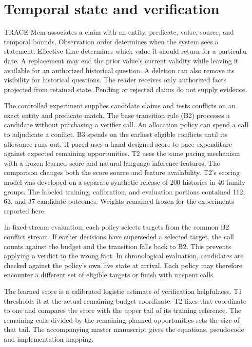 \documentclass[
  11pt,
]{article}
\begin{document}
\section{Temporal state and
verification}\label{temporal-state-and-verification}

TRACE-Mem associates a claim with an entity, predicate, value, source,
and temporal bounds. Observation order determines when the system sees a
statement. Effective time determines which value it should return for a
particular date. A replacement may end the prior value's current
validity while leaving it available for an authorized historical
question. A deletion can also remove its visibility for historical
questions. The reader receives only authorized facts projected from
retained state. Pending or rejected claims do not supply evidence.

The controlled experiment supplies candidate claims and tests conflicts
on an exact entity and predicate match. The base transition rule (B2)
processes a candidate without purchasing a verifier call. An allocation
policy can spend a call to adjudicate a conflict. B3 spends on the
earliest eligible conflicts until its allowance runs out. H-paced uses a
hand-designed score to pace expenditure against expected remaining
opportunities. T2 uses the same pacing mechanism with a frozen learned
score and natural language inference features. The comparison changes
both the score source and feature availability. T2's scoring model was
developed on a separate synthetic release of 200 histories in 40 family
groups. The labeled training, calibration, and evaluation portions
contained 112, 63, and 37 candidate outcomes. Weights remained frozen
for the experiments reported here.

In fixed-stream evaluation, each policy selects targets from the common
B2 conflict stream. If earlier decisions have superseded a selected
target, the call counts against the budget and the transition falls back
to B2. This prevents applying a verdict to the wrong fact. In
chronological evaluation, candidates are checked against the policy's
own live state at arrival. Each policy may therefore encounter a
different set of eligible targets or finish with unspent calls.

The learned score is a calibrated logistic estimate of verification
helpfulness. T1 thresholds it at the actual remaining-budget coordinate.
T2 fixes that coordinate to one and compares the score with the upper
tail of its training reference. The remaining calls divided by the
remaining planned opportunities sets the size of that tail. The
accompanying master manuscript gives the equations, pseudocode and
implementation mapping.
\end{document}
